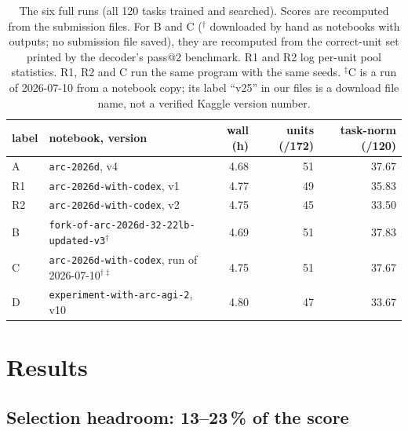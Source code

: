 \documentclass[11pt]{article}
\newcommand{\code}[1]{\texttt{#1}}
\newcommand{\R}[1]{R#1}
\begin{document}
\begin{table}[t]
\centering
\caption{The six full runs (all 120 tasks trained and searched). Scores are recomputed from the submission files. For B and C ($^\dagger$ downloaded by hand as notebooks with outputs; no submission file saved), they are recomputed from the correct-unit set printed by the decoder's pass@2 benchmark. \R{1} and \R{2} log per-unit pool statistics. \R{1}, \R{2} and C run the same program with the same seeds. $^\ddagger$C is a run of 2026-07-10 from a notebook copy; its label ``v25'' in our files is a download file name, not a verified Kaggle version number.}
\label{tab:runs}
\small
\begin{tabular}{llrrr}
\toprule
label & notebook, version & wall (h) & units (/172) & task-norm (/120) \\
\midrule
A & \code{arc-2026d}, v4 & 4.68 & 51 & 37.67 \\
\R{1} & \code{arc-2026d-with-codex}, v1 & 4.77 & 49 & 35.83 \\
\R{2} & \code{arc-2026d-with-codex}, v2 & 4.75 & 45 & 33.50 \\
B & \code{fork-of-arc-2026d-32-22lb-updated-v3}$^\dagger$ & 4.69 & 51 & 37.83 \\
C & \code{arc-2026d-with-codex}, run of 2026-07-10$^{\dagger\ddagger}$ & 4.75 & 51 & 37.67 \\
D & \code{experiment-with-arc-agi-2}, v10 & 4.80 & 47 & 33.67 \\
\bottomrule
\end{tabular}
\end{table}

\section{Results}

\subsection{Selection headroom: 13--23\,\% of the score}
\label{sec:selection}
\end{document}
